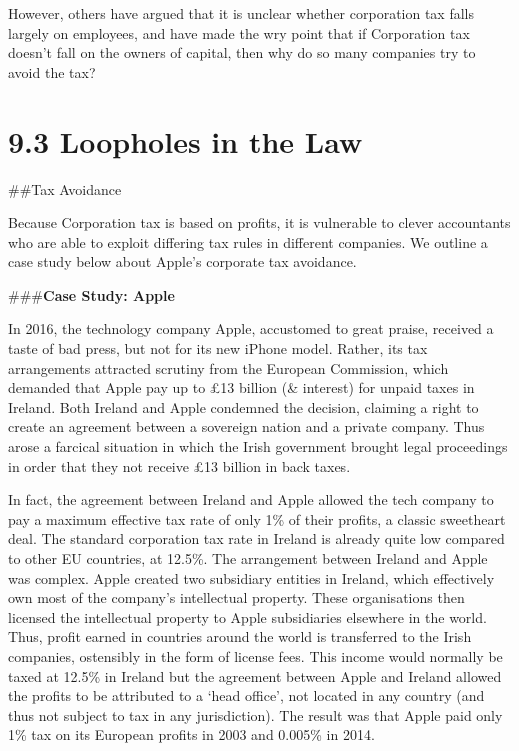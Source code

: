 \documentclass[]{tufte-handout}
\begin{document}
However, others have argued that it is unclear whether corporation tax
falls largely on employees, and have made the wry point that if
Corporation tax doesn't fall on the owners of capital, then why do so
many companies try to avoid the tax?

\hypertarget{loopholes-in-the-law}{%
\section{9.3 Loopholes in the Law}\label{loopholes-in-the-law}}

\#\#Tax Avoidance

Because Corporation tax is based on profits, it is vulnerable to clever
accountants who are able to exploit differing tax rules in different
companies. We outline a case study below about Apple's corporate tax
avoidance.

\#\#\#\textbf{Case Study: Apple}

In 2016, the technology company Apple, accustomed to great praise,
received a taste of bad press, but not for its new iPhone model. Rather,
its tax arrangements attracted scrutiny from the European Commission,
which demanded that Apple pay up to £13 billion (\& interest) for unpaid
taxes in Ireland. Both Ireland and Apple condemned the decision,
claiming a right to create an agreement between a sovereign nation and a
private company. Thus arose a farcical situation in which the Irish
government brought legal proceedings in order that they not receive £13
billion in back taxes.

In fact, the agreement between Ireland and Apple allowed the tech
company to pay a maximum effective tax rate of only 1\% of their
profits, a classic sweetheart deal. The standard corporation tax rate in
Ireland is already quite low compared to other EU countries, at 12.5\%.
The arrangement between Ireland and Apple was complex. Apple created two
subsidiary entities in Ireland, which effectively own most of the
company's intellectual property. These organisations then licensed the
intellectual property to Apple subsidiaries elsewhere in the world.
Thus, profit earned in countries around the world is transferred to the
Irish companies, ostensibly in the form of license fees. This income
would normally be taxed at 12.5\% in Ireland but the agreement between
Apple and Ireland allowed the profits to be attributed to a `head
office', not located in any country (and thus not subject to tax in any
jurisdiction). The result was that Apple paid only 1\% tax on its
European profits in 2003 and 0.005\% in 2014.
\end{document}
